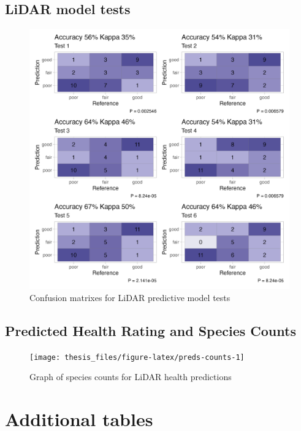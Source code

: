 \documentclass[12pt,twoside]{reedthesis}
\begin{document}
\hypertarget{lidar-model-tests}{%
\subsection*{LiDAR model tests}\label{lidar-model-tests}}
\begin{figure}[H]

{\centering \includegraphics[width=1\linewidth,]{figure/test} 

}

\caption{Confusion matrixes for LiDAR predictive model tests}\label{fig:lidar-model-test}
\end{figure}
\hypertarget{predicted-health-rating-and-species-counts}{%
\subsection*{Predicted Health Rating and Species Counts}\label{predicted-health-rating-and-species-counts}}
\begin{figure}[H]

{\centering \texttt{[image: thesis\_files/figure-latex/preds-counts-1]} 

}

\caption{Graph of species counts for LiDAR health predictions}\label{fig:preds-counts}
\end{figure}
\hypertarget{additional-tables}{%
\section{Additional tables}\label{additional-tables}}
\end{document}
